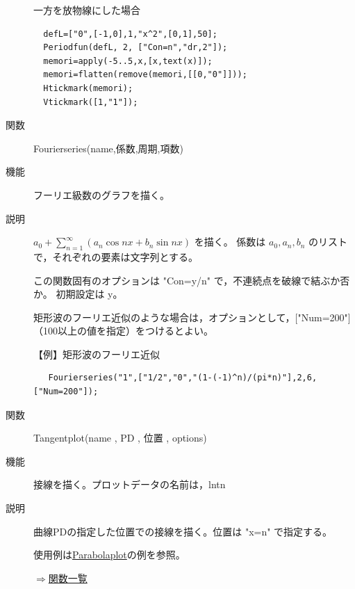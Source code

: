 \documentclass[papersize,a4paper,12pt,uplatex]{jsarticle}
\begin{document}
\begin{description}
\hspace{20mm}

\vspace{\baselineskip}
一方を放物線にした場合  
\begin{verbatim}
  defL=["0",[-1,0],1,"x^2",[0,1],50];
  Periodfun(defL, 2, ["Con=n","dr,2"]);
  memori=apply(-5..5,x,[x,text(x)]);
  memori=flatten(remove(memori,[[0,"0"]]));
  Htickmark(memori);
  Vtickmark([1,"1"]);
\end{verbatim}

\hspace{20mm}

\vspace{\baselineskip}
\hypertarget{fourierseries}{}
\item[関数]  Fourierseries(name,係数,周期,項数)
\item[機能]  フーリエ級数のグラフを描く。
\item[説明]  $a_0+\displaystyle{\sum _{n=1} ^{\infty}(a_n \cos nx + b_n \sin nx)}$ を描く。
係数は $a_0,a_n,b_n$ のリストで，それぞれの要素は文字列とする。

この関数固有のオプションは "Con=y/n" で，不連続点を破線で結ぶか否か。 初期設定は y。

矩形波のフーリエ近似のような場合は，オプションとして，["Num=200"]（100以上の値を指定）をつけるとよい。

\vspace{\baselineskip}
【例】矩形波のフーリエ近似
\begin{verbatim}
   Fourierseries("1",["1/2","0","(1-(-1)^n)/(pi*n)"],2,6,["Num=200"]);
\end{verbatim}

\begin{center}

\end{center}

\vspace{\baselineskip}
\hypertarget{tangentplot}{}
\item[関数]  Tangentplot(name , PD , 位置 , options)
\item[機能]  接線を描く。プロットデータの名前は，lntn
\item[説明]  曲線PDの指定した位置での接線を描く。位置は "x=n" で指定する。

使用例は\hyperlink{parabolaplot}{Parabolaplot}の例を参照。

\begin{flushright}  \hyperlink{functionlist}{$\Rightarrow$関数一覧}\end{flushright}

\end{description}
\end{document}
